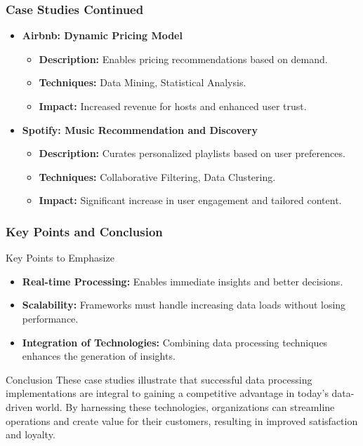 \documentclass[aspectratio=169]{beamer}
\begin{document}
\begin{frame}[fragile]
    \frametitle{Case Studies Continued}
    \begin{itemize}
        \item \textbf{Airbnb: Dynamic Pricing Model}
            \begin{itemize}
                \item \textbf{Description:} Enables pricing recommendations based on demand.
                \item \textbf{Techniques:} Data Mining, Statistical Analysis.
                \item \textbf{Impact:} Increased revenue for hosts and enhanced user trust.
            \end{itemize}

        \item \textbf{Spotify: Music Recommendation and Discovery}
            \begin{itemize}
                \item \textbf{Description:} Curates personalized playlists based on user preferences.
                \item \textbf{Techniques:} Collaborative Filtering, Data Clustering.
                \item \textbf{Impact:} Significant increase in user engagement and tailored content.
            \end{itemize}
    \end{itemize}
\end{frame}

\begin{frame}[fragile]
    \frametitle{Key Points and Conclusion}
    \begin{block}{Key Points to Emphasize}
        \begin{itemize}
            \item \textbf{Real-time Processing:} Enables immediate insights and better decisions.
            \item \textbf{Scalability:} Frameworks must handle increasing data loads without losing performance.
            \item \textbf{Integration of Technologies:} Combining data processing techniques enhances the generation of insights.
        \end{itemize}
    \end{block}

    \begin{block}{Conclusion}
        These case studies illustrate that successful data processing implementations are integral to gaining a competitive advantage in today’s data-driven world. By harnessing these technologies, organizations can streamline operations and create value for their customers, resulting in improved satisfaction and loyalty.
    \end{block}
\end{frame}
\end{document}
